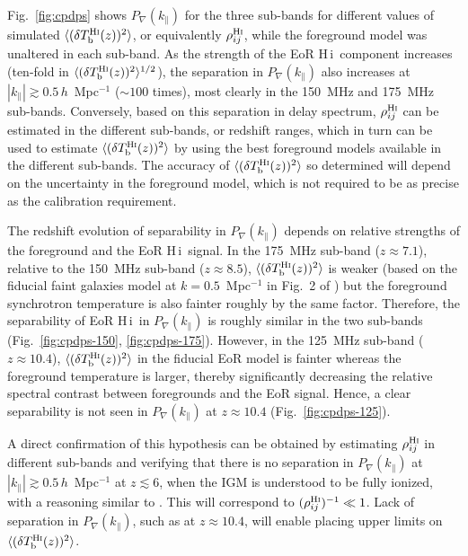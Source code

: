 \documentclass[
reprint,
superscriptaddress,
amsmath,
amssymb,
aps,
prd
]{revtex4-1}
\newcommand{\HI}{H\,{\sc i}}
\begin{document}
Fig.~\ref{fig:cpdps} shows $P_\nabla(k_\parallel)$ for the three sub-bands for different values of simulated $\langle(\delta T_\textrm{b}^\textrm{H{\sc i}}(z))^2\rangle$, or equivalently $\rho_{ij}^\textrm{H{\sc i}}$, while the foreground model was unaltered in each sub-band. As the strength of the EoR \HI\ component increases (ten-fold in $\langle(\delta T_\textrm{b}^\textrm{H{\sc i}}(z))^2\rangle^{1/2}$), the separation in $P_\nabla(k_\parallel)$ also increases at $|k_\parallel| \gtrsim 0.5\,h$~Mpc$^{-1}$ ($\sim 100$ times), most clearly in the 150~MHz and 175~MHz sub-bands. Conversely, based on this separation in delay spectrum, $\rho_{ij}^\textrm{H{\sc i}}$ can be estimated in the different sub-bands, or redshift ranges, which in turn can be used to estimate $\langle(\delta T_\textrm{b}^\textrm{H{\sc i}}(z))^2\rangle$ by using the best foreground models available in the different sub-bands. The accuracy of $\langle(\delta T_\textrm{b}^\textrm{H{\sc i}}(z))^2\rangle$ so determined will depend on the uncertainty in the foreground model, which is not required to be as precise as the calibration requirement.

The redshift evolution of separability in $P_\nabla(k_\parallel)$ depends on relative strengths of the foreground and the EoR \HI\ signal. In the 175~MHz sub-band ($z\approx 7.1$), relative to the 150~MHz sub-band ($z\approx 8.5$), $\langle(\delta T_\textrm{b}^\textrm{H{\sc i}}(z))^2\rangle$ is weaker (based on the fiducial {\sc faint galaxies} model at $k=0.5$~Mpc$^{-1}$ in Fig.~2 of \cite{gre17b}) but the foreground synchrotron temperature is also fainter roughly by the same factor. Therefore, the separability of EoR \HI\ in $P_\nabla(k_\parallel)$ is roughly similar in the two sub-bands (Fig.~\ref{fig:cpdps-150}, \ref{fig:cpdps-175}). However, in the 125~MHz sub-band ($z\approx 10.4$), $\langle(\delta T_\textrm{b}^\textrm{H{\sc i}}(z))^2\rangle$ in the fiducial EoR model is fainter whereas the foreground temperature is larger, thereby significantly decreasing the relative spectral contrast between foregrounds and the EoR signal. Hence, a clear separability is not seen in $P_\nabla(k_\parallel)$ at $z\approx 10.4$ (Fig.~\ref{fig:cpdps-125}).

A direct confirmation of this hypothesis can be obtained by estimating $\rho_{ij}^\textrm{H{\sc i}}$ in different sub-bands and verifying that there is no separation in $P_\nabla(k_\parallel)$ at $|k_\parallel| \gtrsim 0.5\,h$~Mpc$^{-1}$ at $z\lesssim 6$, when the IGM is understood to be fully ionized, with a reasoning similar to \cite{pob16b}. This will correspond to $(\rho_{ij}^\textrm{H{\sc i}})^{-1} \ll 1$. Lack of separation in $P_\nabla(k_\parallel)$, such as at $z\approx 10.4$, will enable placing upper limits on $\langle (\delta T_\textrm{b}^\textrm{H{\sc i}}(z))^2\rangle$.
\end{document}

